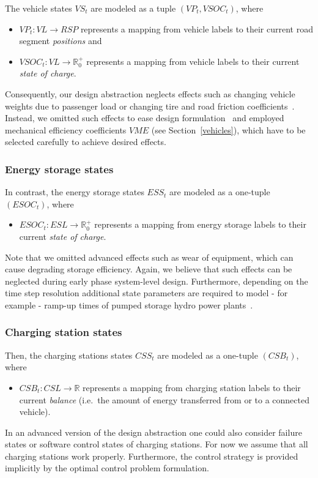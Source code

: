 The vehicle states $VS_t$ are modeled as a tuple $(VP_t, VSOC_t)$, where
\begin{itemize}
	\item $VP_t: VL \rightarrow RSP$ represents a mapping from vehicle labels to their current road segment \textit{positions} and
	\item $VSOC_t: VL \rightarrow \mathbb{R}_0^+$ represents a mapping from vehicle labels to their current \textit{state of charge}.
\end{itemize}
Consequently, our design abstraction neglects effects such as changing vehicle weights due to passenger load or changing tire and road friction coefficients~\cite{imine2006road}.
Instead, we omitted such effects to ease design formulation~\cite{gao2007modeling} and employed mechanical efficiency coefficients $VME$ (see Section~\ref{vehicles}), which have to be selected carefully to achieve desired effects.

\subsubsection{Energy storage states}
\label{states_storages}

In contrast, the energy storage states $ESS_t$ are modeled as a one-tuple $(ESOC_t)$, where
\begin{itemize}
	\item $ESOC_t: ESL \rightarrow \mathbb{R}_0^+$ represents a mapping from energy storage labels to their current \textit{state of charge}. 
\end{itemize}
Note that we omitted advanced effects such as wear of equipment, 
which can cause degrading storage efficiency. Again, we believe that such effects can be neglected during early phase system-level design. Furthermore, depending on the time step resolution additional state parameters are required to model - for example - ramp-up times of pumped storage hydro power plants~\cite{Garcia2008}.

\subsubsection{Charging station states}
\label{states_stations}

Then, the charging stations states $CSS_t$ are modeled as a one-tuple $(CSB_t)$, where
\begin{itemize}
	\item $CSB_t: CSL \rightarrow \mathbb{R}$ represents a mapping from charging station labels to their current \textit{balance} (i.e.\ the amount of energy transferred from or to a connected vehicle).
\end{itemize}
In an advanced version of the design abstraction one could also consider failure states or software control states of charging stations. For now we assume that all charging stations work properly. Furthermore, the control strategy is provided implicitly by the optimal control problem formulation.


